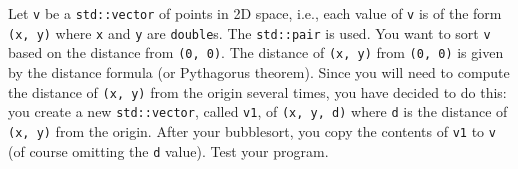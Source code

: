   Let \verb!v! be a \verb!std::vector! of points in 2D space, i.e.,
  each value of \verb!v! is of the form \verb!(x, y)! where \verb!x! and
  \verb!y! are \verb!double!s.
  The \verb!std::pair! is used.
  You want to sort \verb!v! based on the distance from \verb!(0, 0)!.
  The distance of \verb!(x, y)! from \verb!(0, 0)! is given by the distance
  formula (or Pythagorus theorem).
  Since you will need to compute the distance of \verb!(x, y)! from the
  origin several times, you have decided to do this:
  you create a new \verb!std::vector!, called \verb!v1!, of \verb!(x, y, d)!
  where \verb!d! is the distance of \verb!(x, y)! from the origin.
  After your bubblesort, you copy the contents of \verb!v1! to \verb!v! (of course omitting the
  \verb!d! value).
  Test your program.
